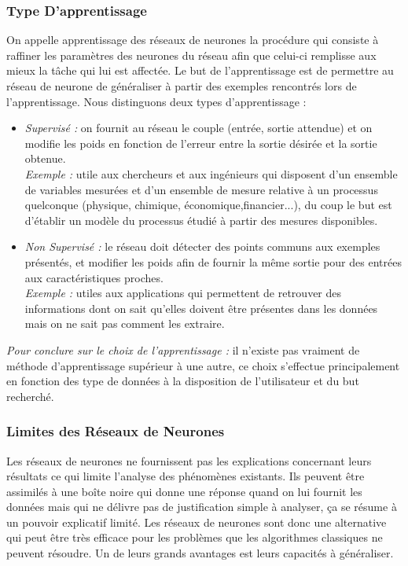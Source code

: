 \documentclass{article}
\begin{document}
		\subsubsection{Type D'apprentissage}
			On appelle apprentissage des réseaux de neurones la procédure qui consiste à raffiner les paramètres des neurones du réseau afin que celui-ci remplisse aux mieux la tâche qui lui est affectée. Le but de l'apprentissage est de permettre au réseau de neurone de généraliser à partir des exemples rencontrés lors de l'apprentissage.
Nous distinguons deux types d'apprentissage :
			\begin{itemize}
				\item \emph{Supervisé : }on fournit au réseau le couple (entrée, sortie attendue) et on modifie les poids en fonction de l'erreur entre la sortie désirée et la sortie obtenue.\\ \emph{Exemple : }utile aux chercheurs et aux ingénieurs qui disposent d'un ensemble de variables mesurées et d'un ensemble de mesure relative à un processus quelconque (physique, chimique, économique,financier...), du coup le but est d'établir un modèle du processus étudié à partir des mesures disponibles.
				\item \emph{Non Supervisé : }le réseau doit détecter des points communs aux exemples présentés, et modifier les poids afin de fournir la même sortie pour des entrées aux caractéristiques proches.\\ \emph{Exemple : }utiles aux applications qui permettent de retrouver des informations dont on sait qu'elles doivent être présentes dans les données mais on ne sait pas comment les extraire.
			\end{itemize}
			\emph{Pour conclure sur le choix de l'apprentissage : }il n'existe pas vraiment de méthode d'apprentissage supérieur à une autre, ce choix s'effectue principalement en fonction des type de données à la disposition de l'utilisateur et du but recherché.
		\subsubsection{Limites des Réseaux de Neurones}
			Les réseaux de neurones ne fournissent pas les explications concernant leurs résultats ce qui limite l'analyse des phénomènes existants. Ils peuvent être assimilés à une boîte noire qui donne une réponse quand on lui fournit les données mais qui ne délivre pas de justification simple à analyser, ça se résume à un pouvoir explicatif limité.
			Les réseaux de neurones sont donc une alternative qui peut être très efficace pour les problèmes que les algorithmes classiques ne peuvent résoudre. Un de leurs grands avantages est leurs capacités à généraliser.
\end{document}
